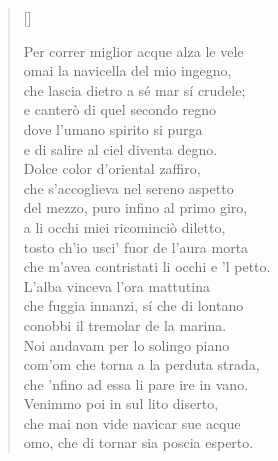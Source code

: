 \documentclass{article}
\begin{document}
\begin{verse}[\versewidth]
  \begin{patverse*}
    Per correr miglior acque alza le vele\\
    omai la navicella del mio ingegno,\\
    che lascia dietro a sé mar sí crudele;\\
    e canterò di quel secondo regno\\
    dove l'umano spirito si purga\\
    e di salire al ciel diventa degno.\\[10pt]
    Dolce color d'oriental zaffiro,\\
    che s'accoglieva nel sereno aspetto\\
    del mezzo, puro infino al primo giro,\\
    a li occhi miei ricominciò diletto,\\
    tosto ch'io usci' fuor de l'aura morta\\
    che m'avea contristati li occhi e 'l petto.\\[10pt]
    L'alba vinceva l'ora mattutina\\
    che fuggia innanzi, sí che di lontano\\
    conobbi il tremolar de la marina.\\
    Noi andavam per lo solingo piano\\
    com'om che torna a la perduta strada,\\
    che 'nfino ad essa li pare ire in vano.\\[10pt]
    Venimmo poi in sul lito diserto,\\
    che mai non vide navicar sue acque\\
    omo, che di tornar sia poscia esperto.
  \end{patverse*}
\end{verse}
\end{document}
